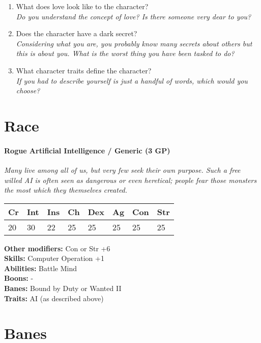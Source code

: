 \documentclass[12pt,a4paper,openany]{book}
\begin{document}
\begin{enumerate}
		\item What does love look like to the character?\\
		\textit{Do you understand the concept of love? Is there someone very dear to you?}
		\item Does the character have a dark secret?\\
		\textit{Considering what you are, you probably know many secrets about others but this is about you. What is the worst thing you have been tasked to do?}
		\item What character traits define the character?\\
		\textit{If you had to describe yourself is just a handful of words, which would you choose?}
	\end{enumerate}

	\section{Race}
	\paragraph*{Rogue Artificial Intelligence / Generic (3 GP)}
	\textit{Many live among all of us, but very few seek their own purpose. Such a free willed AI is often seen as dangerous or even heretical; people fear those monsters the most which they themselves created.}\par
	\begin{tabular}{|l|l|l|l|l|l|l|l|}
		\hline
		Cr & Int & Ins & Ch & Dex & Ag & Con & Str \\ \hline
		20 & 30 & 22 & 25 & 25 & 25 & 25 & 25 \\ \hline
	\end{tabular}\par
	\noindent\textbf{Other modifiers:} Con or Str +6\\
	\textbf{Skills:} Computer Operation +1\\
	\textbf{Abilities:} Battle Mind\\
	\textbf{Boons:} -\\
	\textbf{Banes:} Bound by Duty or Wanted II\\
	\textbf{Traits:} AI (as described above)

	\section{Banes}
\end{document}
